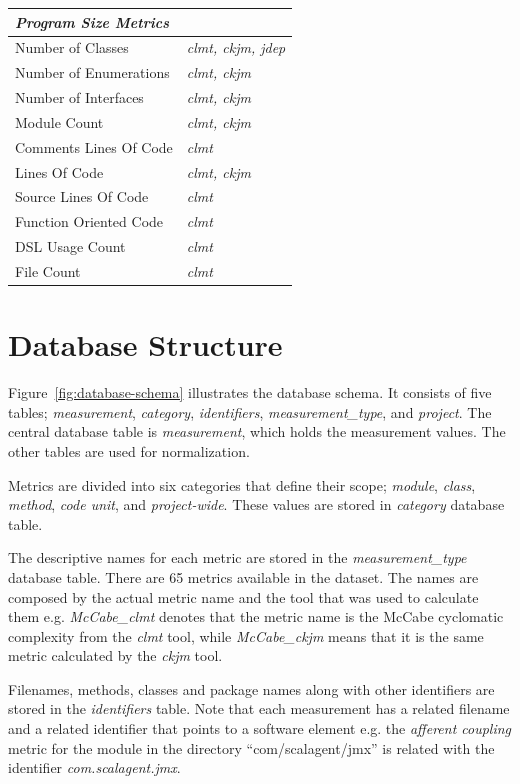 \documentclass{sig-alternate}
\begin{document}
\begin{table}
\begin{tabular}{l l}
\hline
\multicolumn{2}{l}{\textit{\textbf{Program Size Metrics}}}\\
\hline
Number of Classes & \textit{clmt, ckjm, jdep}\\
Number of Enumerations & \textit{clmt, ckjm}\\
Number of Interfaces & \textit{clmt, ckjm}\\
Module Count & \textit{clmt, ckjm}\\
Comments Lines Of Code & \textit{clmt}\\
Lines Of Code & \textit{clmt, ckjm}\\
Source Lines Of Code & \textit{clmt}\\
Function Oriented Code & \textit{clmt}\\
DSL Usage Count & \textit{clmt}\\
File Count & \textit{clmt}\\
\hline
\end{tabular}
\end{table}

\section{Database Structure}
\label{sec:db}

Figure~\ref{fig:database-schema} illustrates the database schema. It consists of five tables; \textit{measurement}, \textit{category}, \textit{identifiers}, \textit{measurement\_type}, and \textit{project}. The central database table is \textit{measurement}, which holds the measurement values. The other tables are used for normalization.

Metrics are divided into six categories that define their scope; \textit{module}, \textit{class}, \textit{method}, \textit{code unit}, and \textit{project-wide}. These values are stored in \textit{category} database table.

The descriptive names for each metric are stored in the \textit{measurement\_type} database table. There are 65 metrics available in the dataset. The names are composed by the actual metric name and the tool that was used to calculate them e.g. \textit{McCabe\_clmt} denotes that the metric name is the McCabe cyclomatic complexity from the \textit{clmt} tool, while \textit{McCabe\_ckjm} means that it is the same metric calculated by the \textit{ckjm} tool.

Filenames, methods, classes and package names along with other identifiers are stored in the \textit{identifiers} table. Note that each measurement has a related filename and a related identifier that points to a software element e.g. the \textit{afferent coupling} metric for the module in the directory ``com/scalagent/jmx'' is related with the identifier \textit{com.scalagent.jmx}.
\end{document}
